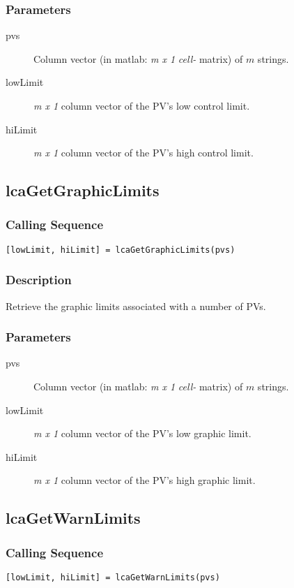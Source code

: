 \documentclass{article}
\newcommand{\pbrk}{\pagebreak[3]}
\newcommand{\ita}[1]{\emph{#1}}
\newcommand{\m}{$m$}
\newcommand{\mhack}{$m$} %
\newcommand{\mxl}{$m\times 1$}
\renewcommand{\m}{\ita{m}}
\newcommand{\mhack}{\ita{m}} %
\renewcommand{\mxl}{\ita{m x 1}}
\renewcommand{\pbrk}{}
\newcommand{\PVITEM}{
\item[pvs] Column vector (in matlab: \mxl{} \ita{cell-} matrix)
of \mhack{} strings.
}
\begin{document}
\subsubsection{Parameters}
\begin{description}
\PVITEM
\item[lowLimit] \mxl{} column vector of the PV's low control limit.
\item[hiLimit]  \mxl{} column vector of the PV's high control limit.
\end{description}


\vspace*{\fill}
\pbrk
\subsection{lcaGetGraphicLimits}
\subsubsection{Calling Sequence}
\begin{verbatim}
[lowLimit, hiLimit] = lcaGetGraphicLimits(pvs)
\end{verbatim}
\subsubsection{Description}
Retrieve the graphic limits associated with a number of PVs.
\subsubsection{Parameters}
\begin{description}
\PVITEM
\item[lowLimit] \mxl{} column vector of the PV's low graphic limit.
\item[hiLimit]  \mxl{} column vector of the PV's high graphic limit.
\end{description}

\vspace*{\fill}
\pbrk
\subsection{lcaGetWarnLimits}
\subsubsection{Calling Sequence}
\begin{verbatim}
[lowLimit, hiLimit] = lcaGetWarnLimits(pvs)
\end{verbatim}
\end{document}
